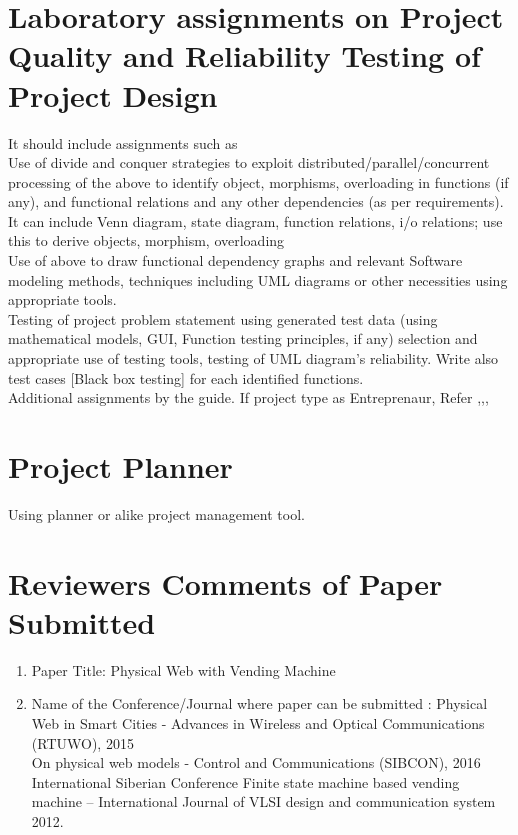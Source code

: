 \documentclass[oneside,a4paper,12pt]{report}
\begin{document}
\begin{appendices}
\chapter{Laboratory assignments on Project Quality and Reliability Testing of Project Design}

It should include assignments such as\\
 Use of divide and conquer strategies to exploit distributed/parallel/concurrent processing of the above to identify object, morphisms, overloading in functions (if any), and functional relations and any other dependencies (as per requirements).\\
             It can include Venn diagram, state diagram, function relations, i/o relations; use this to derive objects, morphism, overloading\\

 Use of above to draw functional dependency graphs and relevant Software modeling methods, techniques including UML diagrams or other necessities using appropriate tools.
 \\
Testing of project problem statement using generated test data (using mathematical models, GUI, Function testing principles, if any) selection and appropriate use of testing tools, testing of UML diagram's reliability. Write also test cases [Black box testing] for each identified functions. \\
 Additional assignments by the guide. If project type as Entreprenaur, Refer \cite{ehr},\cite{mckinsey},\cite{mckinseyweb}, \cite{govwebsite}


\chapter{Project Planner}
\label{app:plan}
Using planner or alike project management tool.




\chapter{Reviewers Comments of Paper Submitted}

\begin{enumerate}
\item Paper Title: Physical Web with Vending Machine

\item Name of the Conference/Journal where paper can be  submitted :
 Physical Web in Smart Cities - Advances in Wireless and Optical Communications (RTUWO), 2015\\
 On physical web models - Control and Communications (SIBCON), 2016 \\
International Siberian Conference Finite state machine based vending machine – International Journal of VLSI design and communication system 2012.\\



\end{enumerate}
\end{appendices}
\end{document}
